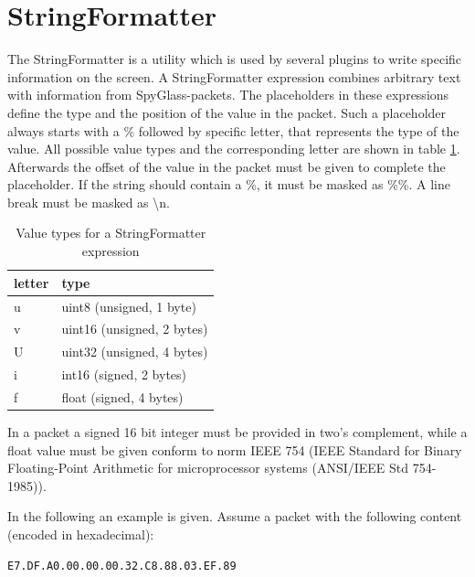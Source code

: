 \newpage
\section{StringFormatter}
\label{section:stringformatter}

The StringFormatter is a utility which is used by several plugins to write specific information on the screen.
A StringFormatter expression combines arbitrary text with information from SpyGlass-packets. The placeholders
in these expressions define the type and the position of the value in the packet. Such a placeholder always
starts with a \% followed by specific letter, that represents the type of the value. All possible value types
and the corresponding letter are shown in table \ref{table:stringformatter_types}. Afterwards the
offset of the value in the packet must be given to complete the placeholder. If the string should contain
a \%, it must be masked as \%\%. A line break must be masked as \textbackslash n.

\begin{table}[htdp]
  \begin{center}
    \begin{tabular}{l|l}
      \textbf{letter} & \textbf{type}\\
      \hline
      \hline
      u & uint8 (unsigned, 1 byte) \\
      \hline
      v & uint16 (unsigned, 2 bytes) \\
      \hline
      U & uint32 (unsigned, 4 bytes)\\
      \hline
      i & int16 (signed, 2 bytes)\\
      \hline
      f & float (signed, 4 bytes)\\
    \end{tabular}
    \caption{Value types for a StringFormatter expression}
    \label{table:stringformatter_types}
  \end{center}
\end{table}

In a packet a signed 16 bit integer must be provided in two's complement, while a float value must be given conform to norm
IEEE 754 (IEEE Standard for Binary Floating-Point Arithmetic for microprocessor systems (ANSI/IEEE Std 754-1985)).

In the following an example is given. Assume a packet with the following content (encoded in hexadecimal):

\begin{verbatim}
E7.DF.A0.00.00.00.32.C8.88.03.EF.89
\end{verbatim}

